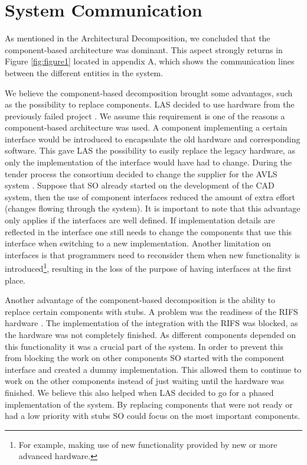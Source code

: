\section*{System Communication}

As mentioned in the Architectural Decomposition, we concluded that the component-based architecture was dominant.
This aspect strongly returns in Figure \ref{fig:figure1} located in appendix A,
which shows the communication lines between the different entities in the system.

We believe the component-based decomposition brought some advantages, such as the possibility to replace components.
LAS decided to use hardware from the previously failed project \autocite[8]{kramer1996succeedings}.
We assume this requirement is one of the reasons a component-based architecture was used.
A component implementing a certain interface would be introduced to encapsulate the old hardware and corresponding software.
This gave LAS the possibility to easily replace the legacy hardware, as only the implementation of the interface would have had to change.
During the tender process the consortium decided to change the supplier for the AVLS system \autocite[3073]{officialreport}.
Suppose that SO already started on the development of the CAD system, then the use of component interfaces reduced the amount of extra effort (changes flowing through the system).
It is important to note that this advantage only applies if the interfaces are well defined.
If implementation details are reflected in the interface one still needs to change the components that use this interface when switching to a new implementation.
Another limitation on interfaces is that programmers need to reconsider them when new functionality is introduced\footnote{For example, making use of new functionality provided by new or more advanced hardware.},
resulting in the loss of the purpose of having interfaces at the first place.

Another advantage of the component-based decomposition is the ability to replace certain components with stubs.
A problem was the readiness of the RIFS hardware \autocite[3074]{officialreport}.
The implementation of the integration with the RIFS was blocked, as the hardware was not completely finished.
As different components depended on this functionality it was a crucial part of the system.
In order to prevent this from blocking the work on other components SO started with the component interface and created a dummy implementation.
This allowed them to continue to work on the other components instead of just waiting until the hardware was finished.
We believe this also helped when LAS decided to go for a phased implementation of the system.
By replacing components that were not ready or had a low priority with stubs SO could focus on the most important components.

